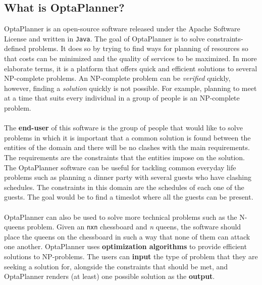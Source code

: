 \subsection{What is OptaPlanner?}
OptaPlanner is an open-source software released under the Apache Software License and written in \verb!Java!. The goal of OptaPlanner is to solve constraints-defined problems. It does so by trying to find ways for planning of resources so that costs can be minimized and the quality of services to be maximized.
In more elaborate terms, it is a platform that offers quick and efficient solutions to several NP-complete problems. An NP-complete problem can be \textit{verified} quickly, however, finding a \textit{solution} quickly is not possible. For example, planning to meet at a time that suits every individual in a group of people is an NP-complete problem.\\\\
The \textbf{end-user} of this software is the group of people that would like to solve problems in which it is important that a common solution is found between the entities of the domain and there will be no clashes with the main requirements. The requirements are the constraints that the entities impose on the solution. 
The OptaPlanner software can be useful for tackling common everyday life problems such as planning a dinner party with several guests who have clashing schedules. The constraints in this domain are the schedules of each one of the guests. The goal would be to find a timeslot where all the guests can be present. \\\\
OptaPlanner can also be used to solve more technical problems such as the N-queens problem. Given an \verb!nxn! chessboard and \textit{n} queens, the software should place the queens on the chessboard in such a way that none of them can attack one another.
OptaPlanner uses \textbf{optimization algorithms} to provide efficient solutions to NP-problems. The users can \textbf{input} the type of problem that they are seeking a solution for, alongside the constraints that should be met, and OptaPlanner renders (at least) one possible solution as the \textbf{output}.\\\\ 

